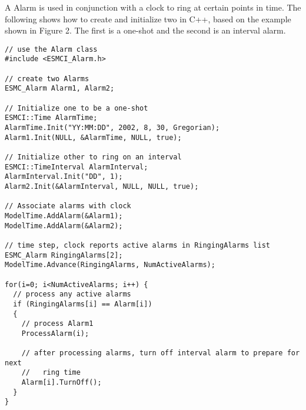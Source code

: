 
A Alarm is used in conjunction with a clock to ring at certain points in time.
The following shows how to create and initialize two in C++, based on the
example shown in Figure 2.  The first is a one-shot and the second is an
interval alarm.

\begin{verbatim}
// use the Alarm class
#include <ESMCI_Alarm.h>

// create two Alarms
ESMC_Alarm Alarm1, Alarm2;

// Initialize one to be a one-shot
ESMCI::Time AlarmTime;
AlarmTime.Init("YY:MM:DD", 2002, 8, 30, Gregorian);
Alarm1.Init(NULL, &AlarmTime, NULL, true);

// Initialize other to ring on an interval
ESMCI::TimeInterval AlarmInterval;
AlarmInterval.Init("DD", 1);
Alarm2.Init(&AlarmInterval, NULL, NULL, true);

// Associate alarms with clock
ModelTime.AddAlarm(&Alarm1);
ModelTime.AddAlarm(&Alarm2);

// time step, clock reports active alarms in RingingAlarms list
ESMC_Alarm RingingAlarms[2];
ModelTime.Advance(RingingAlarms, NumActiveAlarms);

for(i=0; i<NumActiveAlarms; i++) {
  // process any active alarms
  if (RingingAlarms[i] == Alarm[i])
  {
    // process Alarm1
    ProcessAlarm(i);

    // after processing alarms, turn off interval alarm to prepare for next
    //   ring time
    Alarm[i].TurnOff();
  }
}
\end{verbatim}
